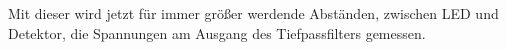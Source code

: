 \noindent Mit dieser wird jetzt für immer größer werdende Abständen, zwischen LED und Detektor, die Spannungen am Ausgang des Tiefpassfilters gemessen.

